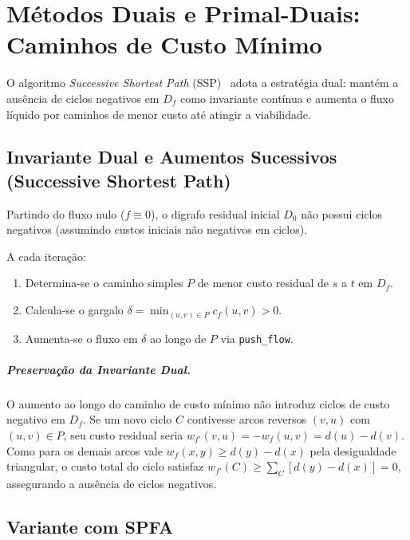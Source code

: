 \chapter{Métodos Duais e Primal-Duais: Caminhos de Custo Mínimo}\label{sec:mcf_dual}

O algoritmo \textit{Successive Shortest Path} (SSP)~\cite{ahuja1993network, schrijver2003combinatorial} adota a estratégia dual: mantém a ausência de ciclos negativos em $D_f$ como invariante contínua e aumenta o fluxo líquido por caminhos de menor custo até atingir a viabilidade.

\section{Invariante Dual e Aumentos Sucessivos (Successive Shortest Path)}\label{sec:ssp}

Partindo do fluxo nulo ($f \equiv 0$), o digrafo residual inicial $D_0$ não possui ciclos negativos (assumindo custos iniciais não negativos em ciclos).

A cada iteração:
\begin{enumerate}
    \item Determina-se o caminho simples $P$ de menor custo residual de $s$ a $t$ em $D_f$.
    \item Calcula-se o gargalo $\delta = \min_{(u,v) \in P} c_f(u,v) > 0$.
    \item Aumenta-se o fluxo em $\delta$ ao longo de $P$ via \lstinline{push_flow}.
\end{enumerate}

\paragraph{Preservação da Invariante Dual.}
O aumento ao longo do caminho de custo mínimo não introduz ciclos de custo negativo em $D_f$. Se um novo ciclo $C$ contivesse arcos reversos $(v,u)$ com $(u,v) \in P$, seu custo residual seria $w_{f'}(v,u) = -w_f(u,v) = d(u) - d(v)$. Como para os demais arcos vale $w_f(x,y) \ge d(y) - d(x)$ pela desigualdade triangular, o custo total do ciclo satisfaz $w_{f'}(C) \ge \sum_C [d(y) - d(x)] = 0$, assegurando a ausência de ciclos negativos.


\section{Variante com SPFA}\label{sec:ssp_spfa}

